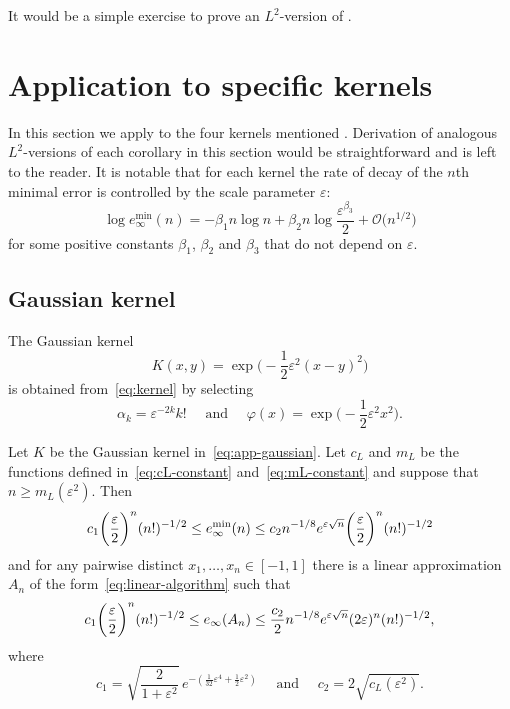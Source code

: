 \documentclass{mcom-l}
\numberwithin{equation}{section}
\numberwithin{theorem}{section} %
\begin{document}
It would be a simple exercise to prove an $L^2$-version of .

\section{Application to specific kernels} \label{sec:applications}

In this section we apply  to the four kernels mentioned .
Derivation of analogous $L^2$-versions of each corollary in this section would be straightforward and is left to the reader.
It is notable that for each kernel the rate of decay of the $n$th minimal error is controlled by the scale parameter $\varepsilon$:
\begin{equation*}
  \log e_\infty^{\min}(n) = -\beta_1 n \log n + \beta_2 n \log \frac{\varepsilon^{\beta_3}}{2} + \mathcal{O}\big( n^{1/2} \big)
\end{equation*}
for some positive constants $\beta_1$, $\beta_2$ and $\beta_3$ that do not depend on $\varepsilon$.


\subsection{Gaussian kernel} \label{sec:app-gaussian}

The Gaussian kernel
\begin{equation} \label{eq:app-gaussian}
  K(x, y) = \exp\bigg(\! -\frac{1}{2} \varepsilon^2 (x - y)^2 \bigg)
\end{equation}
is obtained from~\eqref{eq:kernel} by selecting
\begin{equation*}
  \alpha_k = \varepsilon^{-2k} k! \quad \text{ and } \quad \varphi(x) = \exp\bigg(\!-\frac{1}{2} \varepsilon^2 x^2 \bigg).
\end{equation*}

\begin{corollary} \label{cor:gaussian}
  Let $K$ be the Gaussian kernel in~\eqref{eq:app-gaussian}.
  Let $c_L$ and $m_L$ be the functions defined in~\eqref{eq:cL-constant} and~\eqref{eq:mL-constant} and suppose that $n \geq m_L(\varepsilon^2)$.
  Then
  \begin{equation*}
    c_1 \bigg( \frac{\varepsilon}{2} \bigg)^n (n!)^{-1/2} \leq e_\infty^{\min}(n) \leq  c_2 n^{-1/8} e^{\varepsilon \sqrt{\smash[b]{n}}} \bigg( \frac{\varepsilon}{2} \bigg)^n (n!)^{-1/2}
  \end{equation*}
  and for any pairwise distinct $x_1, \ldots, x_n \in [-1, 1]$ there is a linear approximation $A_n$ of the form~\eqref{eq:linear-algorithm} such that
  \begin{equation*}
    c_1 \bigg( \frac{\varepsilon}{2} \bigg)^n (n!)^{-1/2} \leq e_\infty(A_n) \leq \frac{c_2}{2} n^{-1/8} e^{ \varepsilon \sqrt{\smash[b]{n}}} (2\varepsilon)^n (n!)^{-1/2},
  \end{equation*}
  where
  \begin{equation*}
    c_1 = \sqrt{ \frac{2}{1 + \varepsilon^2}} \, e^{-(\frac{1}{32} \varepsilon^4 + \frac{1}{2} \varepsilon^2)} \quad \text{ and } \quad c_2 = 2 \sqrt{c_L(\varepsilon^2)}.
  \end{equation*}
\end{corollary}
\end{document}
